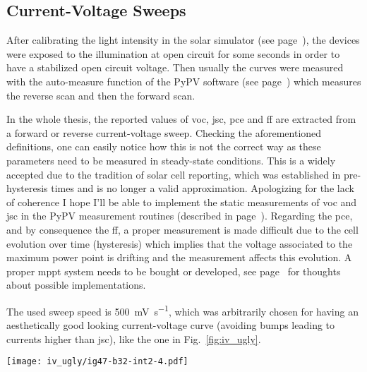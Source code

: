 	\subsection{Current-Voltage Sweeps}

		After calibrating the light intensity in the solar simulator (see page~\pageref{solarsimulator}), the devices were exposed to the illumination at open circuit for some seconds in order to have a stabilized open circuit voltage. Then usually the curves were measured with the auto-measure function of the PyPV software (see page~\pageref{automeasure}) which measures the reverse scan and then the forward scan.
		
			In the whole thesis, the reported values of \gls{voc}, \gls{jsc}, \gls{pce} and \gls{ff} are extracted from a forward or reverse current-voltage sweep. Checking the aforementioned definitions, one can easily notice how this is not the correct way as these parameters need to be measured in steady-state conditions. This is a widely accepted due to the tradition of solar cell reporting, which was established in pre-hysteresis times and is no longer a valid approximation. Apologizing for the lack of coherence I hope I'll be able to implement the static measurements of \gls{voc} and \gls{jsc} in the PyPV measurement routines (described in page~\pageref{automeasure}). Regarding the \gls{pce}, and by consequence the \gls{ff}, a proper measurement is made difficult due to the cell evolution over time (hysteresis) which implies that the voltage associated to the maximum power point is drifting and the measurement affects this evolution. A proper \gls{mppt} system needs to be bought or developed, see page~\pageref{software_mppt} for thoughts about possible implementations.

			The used sweep speed is \SI{500}{\mV\per\s}, which was arbitrarily chosen for having an aesthetically good looking current-voltage curve (avoiding bumps leading to currents higher than \gls{jsc}), like the one in Fig.~\ref{fig:iv_ugly}.

			\begin{SCfigure}%
				\centering
				\texttt{[image: iv\_ugly/ig47-b32-int2-4.pdf]}
				\label{fig:iv_ugly}
			\end{SCfigure}


